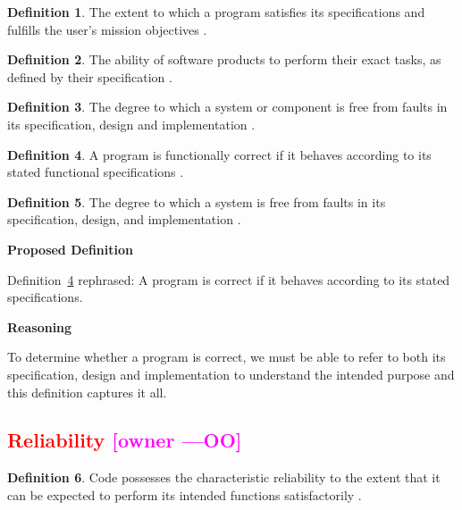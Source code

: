 \documentclass[letterpaper, cleveref]{lipics-v2019}
\newcommand{\authornote}[3]{\textcolor{#1}{[#3 ---#2]}}
\newcommand{\authornote}[3]{}
\newcommand{\oo}[1]{\authornote{magenta}{OO}{#1}} %
\newcommand{\notdone}[1]{\textcolor{red}{#1}}
\theoremstyle{definition}
\newtheorem{defn}{Definition}
\begin{document}
\begin{defn} 
  The extent to which a program satisfies its specifications and fulfills the
  user's mission objectives \citep{McCallEtAl1977}. 
\end{defn}

\begin{defn}
  The ability of software products to perform their exact tasks, as defined by
  their specification \citep{meyer1988object}.
\end{defn}

\begin{defn}  
  The degree to which a system or component is free from faults in its
  specification, design and implementation \citep{IEEEComputerDictionary1991}.
\end{defn}

\begin{defn} \label{Correctness_Selected}
  A program is functionally correct if it behaves according to its stated
  functional specifications \citep{GhezziEtAl2003}.  	
\end{defn}

\begin{defn}
  The degree to which a system is free from faults in its specification, design, and 
  implementation \citep{mcconnell2004code}.
\end{defn}

\noindent \textbf{Proposed Definition}

Definition~\ref{Correctness_Selected} rephrased: A program is correct if it
behaves according to its stated specifications.

\noindent \textbf{Reasoning}

To determine whether a program is correct, we must be able to refer to both its
specification, design and implementation to understand the intended purpose and
this definition captures it all.


\subsection{\notdone{Reliability} \oo{owner}}

\begin{defn}
  Code possesses the characteristic reliability to the extent that it can be
  expected to perform its intended functions satisfactorily
  \citep{boehm1976quantitative}.
\end{defn}
\end{document}
